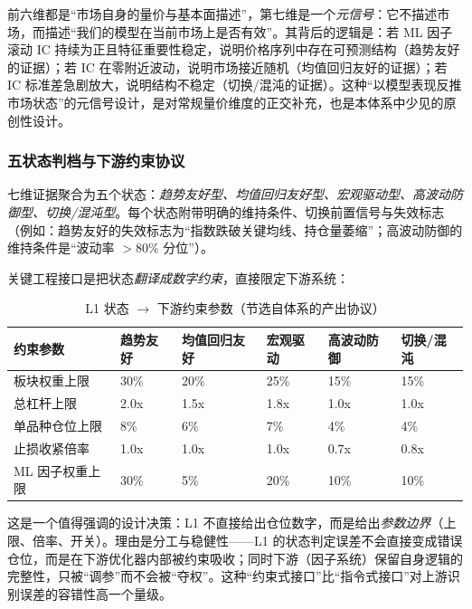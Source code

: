 \begin{remark}[第七条维度的设计哲学]
前六维都是“市场自身的量价与基本面描述”，第七维是一个\emph{元信号}：它不描述市场，而描述“我们的模型在当前市场上是否有效”。其背后的逻辑是：若 ML 因子滚动 IC 持续为正且特征重要性稳定，说明价格序列中存在可预测结构（趋势友好的证据）；若 IC 在零附近波动，说明市场接近随机（均值回归友好的证据）；若 IC 标准差急剧放大，说明结构不稳定（切换/混沌的证据）。这种“以模型表现反推市场状态”的元信号设计，是对常规量价维度的正交补充，也是本体系中少见的原创性设计。
\end{remark}

\subsubsection{五状态判档与下游约束协议}

七维证据聚合为五个状态：\emph{趋势友好型、均值回归友好型、宏观驱动型、高波动防御型、切换/混沌型}。每个状态附带明确的维持条件、切换前置信号与失效标志（例如：趋势友好的失效标志为“指数跌破关键均线、持仓量萎缩”；高波动防御的维持条件是“波动率 $> 80\%$ 分位”）。

关键工程接口是把状态\emph{翻译成数字约束}，直接限定下游系统：

\begin{table}[htbp]
\centering
\footnotesize
\begin{tabular}{p{2.6cm}p{1.4cm}p{1.9cm}p{1.4cm}p{1.7cm}p{1.7cm}}
\toprule
\textbf{约束参数} & \textbf{趋势友好} & \textbf{均值回归友好} & \textbf{宏观驱动} & \textbf{高波动防御} & \textbf{切换/混沌} \\
\midrule
板块权重上限 & 30\% & 20\% & 25\% & 15\% & 15\% \\
总杠杆上限 & 2.0x & 1.5x & 1.8x & 1.0x & 1.0x \\
单品种仓位上限 & 8\% & 6\% & 7\% & 4\% & 4\% \\
止损收紧倍率 & 1.0x & 1.0x & 1.0x & 0.7x & 0.8x \\
ML 因子权重上限 & 30\% & 5\% & 20\% & 10\% & 10\% \\
\bottomrule
\end{tabular}
\caption{L1 状态 $\to$ 下游约束参数（节选自体系的产出协议）}
\label{tab:l1-constraints}
\end{table}

\begin{remark}
这是一个值得强调的设计决策：L1 不直接给出仓位数字，而是给出\emph{参数边界}（上限、倍率、开关）。理由是分工与稳健性——L1 的状态判定误差不会直接变成错误仓位，而是在下游优化器内部被约束吸收；同时下游（因子系统）保留自身逻辑的完整性，只被“调参”而不会被“夺权”。这种“约束式接口”比“指令式接口”对上游识别误差的容错性高一个量级。
\end{remark}


